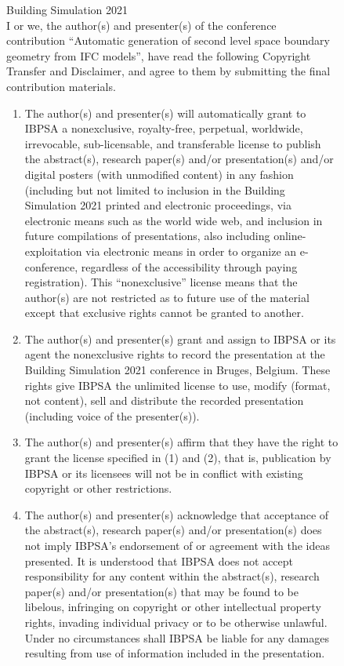 \documentclass[twocolumn, a4paper,10pt]{article}
\begin{document}
\begin{figure}[ht]
\centering
\begin{boxedminipage}{\textwidth}
Building Simulation 2021\\
 
I or we, the author(s) and presenter(s) of the conference contribution ``Automatic generation of second level space boundary geometry from IFC models'', have read the following Copyright Transfer and Disclaimer, and agree to them by submitting the final contribution materials.
 
 \begin{enumerate}
 \item The author(s) and presenter(s) will automatically grant to IBPSA a nonexclusive, royalty-free, perpetual, worldwide, irrevocable, sub-licensable, and transferable license to publish the abstract(s), research paper(s) and/or presentation(s) and/or digital posters (with unmodified content) in any fashion (including but not limited to inclusion in the Building Simulation 2021 printed and electronic proceedings, via electronic means such as the world wide web, and inclusion in future compilations of presentations, also including online-exploitation via electronic means in order to organize an e-conference, regardless of the accessibility through paying registration). This ``nonexclusive'' license means that the author(s) are not restricted as to future use of the material except that exclusive rights cannot be granted to another.
 
\item The author(s) and presenter(s) grant and assign to IBPSA or its agent the nonexclusive rights to record the presentation at the Building Simulation 2021 conference in Bruges, Belgium. These rights give IBPSA the unlimited license to use, modify (format, not content), sell and distribute the recorded presentation (including voice of the presenter(s)).
 
\item The author(s) and presenter(s) affirm that they have the right to grant the license specified in (1) and (2), that is, publication by IBPSA or its licensees will not be in conflict with existing copyright or other restrictions.
 
\item The author(s) and presenter(s) acknowledge that acceptance of the abstract(s), research paper(s) and/or presentation(s) does not imply IBPSA's endorsement of or agreement with the ideas presented. It is understood that IBPSA does not accept responsibility for any content within the abstract(s), research paper(s) and/or presentation(s) that may be found to be libelous, infringing on copyright or other intellectual property rights, invading individual privacy or to be otherwise unlawful. Under no circumstances shall IBPSA be liable for any damages resulting from use of information included in the presentation.
 

\end{enumerate}
\end{boxedminipage}
\end{figure}
\end{document}
